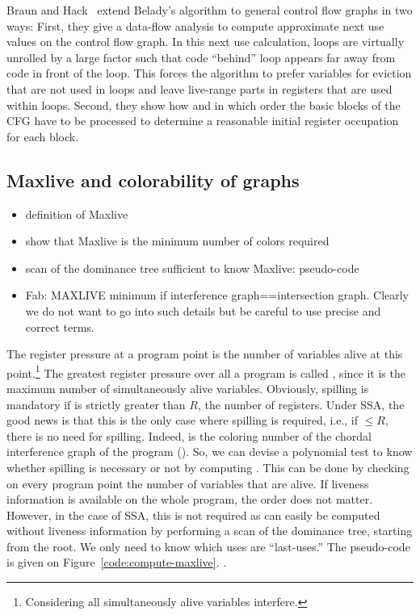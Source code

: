 {Braun and Hack~\cite{BH:2009:Spill} extend Belady's algorithm to general control flow graphs in two ways:
First, they give a data-flow analysis to compute approximate next use values on the control flow graph.
In this next use calculation, loops are virtually unrolled by a large factor such that code ``behind'' loop appears far away from code in front of the loop.
This forces the algorithm to prefer variables for eviction that are not used in loops and leave live-range parts in registers that are used within loops.
Second, they show how and in which order the basic blocks of the CFG have to be processed to determine a reasonable initial register occupation for each block.

\subsection{Maxlive and colorability of graphs}

{\sl
\begin{itemize}
  \item definition of Maxlive
  \item show that Maxlive is the minimum number of colors required
  \item scan of the dominance tree sufficient to know Maxlive: pseudo-code
  \item Fab: MAXLIVE minimum if interference graph==intersection graph. Clearly we do not want to go into such details but be careful to use precise and correct terms.
\end{itemize}
}
    
The register pressure at a program point is the number of variables alive at 
this point.\footnote{Considering all simultaneously alive variables interfere.}
The greatest register pressure over all a program is called \maxlive, 
since it is the maximum number of simultaneously alive variables. Obviously, 
spilling is mandatory if \maxlive is strictly greater than $R$, the number of 
registers.
Under SSA, the good news is that this is the only case where spilling is 
required, i.e., if \maxlive $\leq R$, there is no need for spilling. Indeed, 
\maxlive is the coloring number of the chordal interference graph of the 
program (). So, we can devise a polynomial test to know 
whether spilling is necessary or not by computing \maxlive. This can be done by 
checking on every program point the number of variables that are alive. If 
liveness information is available on the whole program, the order does not 
matter. However, in the case of SSA, this is not required as \maxlive can 
easily be computed without liveness information by performing a scan of the 
dominance tree, starting from the root. We only need to know which uses are 
``last-uses.'' The pseudo-code is given on Figure~\ref{code:compute-maxlive}.
.


}
